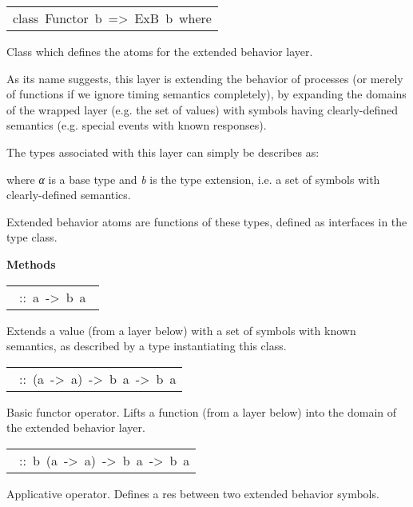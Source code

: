 \begin{haddockdesc}
\item[\begin{tabular}{@{}l}
class\ Functor\ b\ =>\ ExB\ b\ where
\end{tabular}]\haddockbegindoc
Class which defines the atoms for the extended behavior layer.\par
As its name suggests, this layer is extending the behavior of
 processes (or merely of functions if we ignore timing semantics
 completely), by expanding the domains of the wrapped layer
 (e.g. the set of values) with symbols having clearly-defined
 semantics (e.g. special events with known responses).\par
The types associated with this layer can simply be describes as:\par
{}\par
where  \emph{α} is a base type and \emph{b} is the type extension,
 i.e. a set of symbols with clearly-defined semantics.\par
Extended behavior atoms are functions of these types, defined as
 interfaces in the  type class.\par

\haddockpremethods{}\textbf{Methods}
\begin{haddockdesc}
\item[\begin{tabular}{@{}l}\haddockid{extend}\ ::\ a\ ->\ b\ a\ \end{tabular}]
\haddockbegindoc
Extends a value (from a layer below) with a set of symbols with known semantics, as described by a type instantiating this class.\par

\item[\begin{tabular}{@{}l}\haddockid{(/.\textbackslash)}\ ::\ (a\ ->\ a)\ ->\ b\ a\ ->\ b\ a\end{tabular}]
\haddockbegindoc
Basic functor operator. Lifts a function (from a layer below) into the domain of the extended behavior layer.\par

\item[\begin{tabular}{@{}l}\haddockid{(/*\textbackslash)}\ ::\ b\ (a\ ->\ a)\ ->\ b\ a\ ->\ b\ a\end{tabular}]
\haddockbegindoc
Applicative operator. Defines a res between two extended behavior symbols.\par


\end{haddockdesc}
\end{haddockdesc}

